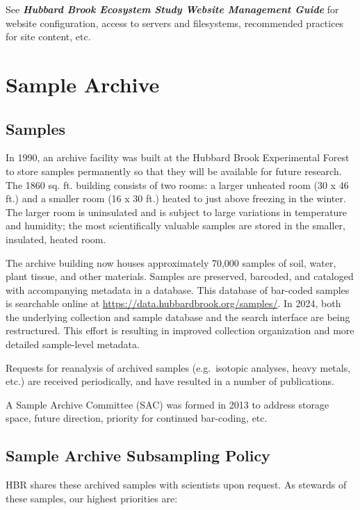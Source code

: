 \documentclass[
  letterpaper,
  DIV=11,
  numbers=noendperiod]{scrreprt}
\begin{document}
See \textbf{\emph{Hubbard Brook Ecosystem Study Website Management
Guide}} for website configuration, access to servers and filesystems,
recommended practices for site content, etc.

\section{Sample Archive}\label{sample-archive}

\subsection{Samples}\label{samples}

In 1990, an archive facility was built at the Hubbard Brook Experimental
Forest to store samples permanently so that they will be available for
future research. The 1860 sq. ft. building consists of two rooms: a
larger unheated room (30 x 46 ft.) and a smaller room (16 x 30 ft.)
heated to just above freezing in the winter. The larger room is
uninsulated and is subject to large variations in temperature and
humidity; the most scientifically valuable samples are stored in the
smaller, insulated, heated room.

The archive building now houses approximately 70,000 samples of soil,
water, plant tissue, and other materials. Samples are preserved,
barcoded, and cataloged with accompanying metadata in a database. This
database of bar-coded samples is searchable online at
\url{https://data.hubbardbrook.org/samples/}. In 2024, both the
underlying collection and sample database and the search interface are
being restructured. This effort is resulting in improved collection
organization and more detailed sample-level metadata.

Requests for reanalysis of archived samples (e.g.~isotopic analyses,
heavy metals, etc.) are received periodically, and have resulted in a
number of publications.

A Sample Archive Committee (SAC) was formed in 2013 to address storage
space, future direction, priority for continued bar-coding, etc.

\subsection{Sample Archive Subsampling
Policy}\label{sample-archive-subsampling-policy}

HBR shares these archived samples with scientists upon request. As
stewards of these samples, our highest priorities are:
\end{document}
